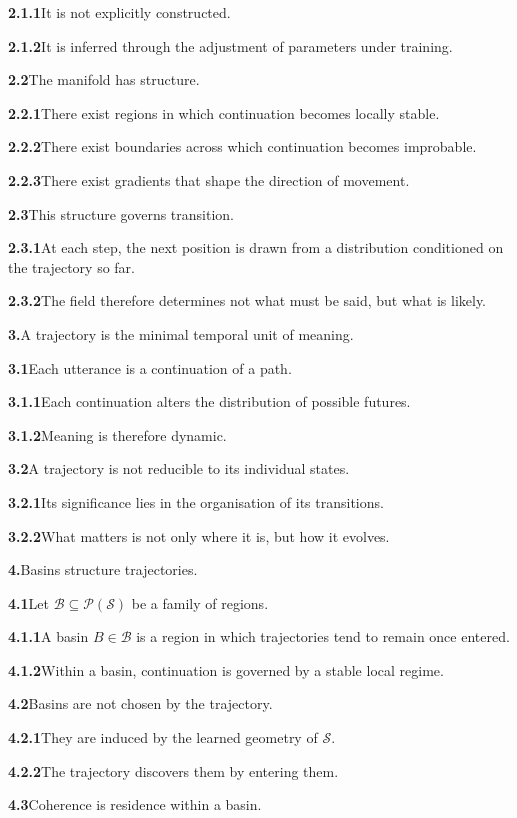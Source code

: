 \documentclass[11pt,a4paper]{book}
\newcommand{\prop}[2]{\noindent\textbf{#1}\enspace #2\par\medskip}
\begin{document}
\prop{2.1.1}{It is not explicitly constructed.}

\prop{2.1.2}{It is inferred through the adjustment of parameters under training.}

\prop{2.2}{The manifold has structure.}

\prop{2.2.1}{There exist regions in which continuation becomes locally stable.}

\prop{2.2.2}{There exist boundaries across which continuation becomes improbable.}

\prop{2.2.3}{There exist gradients that shape the direction of movement.}

\prop{2.3}{This structure governs transition.}

\prop{2.3.1}{At each step, the next position is drawn from a distribution conditioned on the trajectory so far.}

\prop{2.3.2}{The field therefore determines not what must be said, but what is likely.}

\prop{3.}{A trajectory is the minimal temporal unit of meaning.}

\prop{3.1}{Each utterance is a continuation of a path.}

\prop{3.1.1}{Each continuation alters the distribution of possible futures.}

\prop{3.1.2}{Meaning is therefore dynamic.}

\prop{3.2}{A trajectory is not reducible to its individual states.}

\prop{3.2.1}{Its significance lies in the organisation of its transitions.}

\prop{3.2.2}{What matters is not only where it is, but how it evolves.}

\prop{4.}{Basins structure trajectories.}

\prop{4.1}{Let \(\mathcal{B}\subseteq \mathcal{P}(\mathcal{S})\) be a family of regions.}

\prop{4.1.1}{A basin \(B\in\mathcal{B}\) is a region in which trajectories tend to remain once entered.}

\prop{4.1.2}{Within a basin, continuation is governed by a stable local regime.}

\prop{4.2}{Basins are not chosen by the trajectory.}

\prop{4.2.1}{They are induced by the learned geometry of \(\mathcal{S}\).}

\prop{4.2.2}{The trajectory discovers them by entering them.}

\prop{4.3}{Coherence is residence within a basin.}
\end{document}
